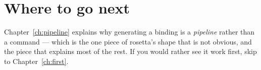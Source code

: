 \section{Where to go next}

Chapter~\ref{ch:pipeline} explains why generating a binding is a
\emph{pipeline} rather than a command --- which is the one piece of rosetta's
shape that is not obvious, and the piece that explains most of the rest.
If you would rather see it work first, skip to Chapter~\ref{ch:first}.
